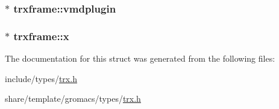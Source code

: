 \hypertarget{structtrxframe_aef4dcd45665ca099f7037958047b60ec}{
\subsubsection[{vmdplugin}]{ $\ast$ {\bf trxframe\-::vmdplugin}}}\label{structtrxframe_aef4dcd45665ca099f7037958047b60ec}
\hypertarget{structtrxframe_a4f360d6f27f315861eaf05947201d306}{
\subsubsection[{x}]{ $\ast$ {\bf trxframe\-::x}}}\label{structtrxframe_a4f360d6f27f315861eaf05947201d306}


\-The documentation for this struct was generated from the following files\-:\begin{DoxyCompactItemize}
\item 
include/types/\hyperlink{include_2types_2trx_8h}{trx.\-h}\item 
share/template/gromacs/types/\hyperlink{share_2template_2gromacs_2types_2trx_8h}{trx.\-h}\end{DoxyCompactItemize}
